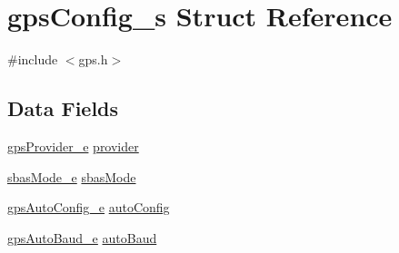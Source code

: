 \hypertarget{structgpsConfig__s}{\section{gps\+Config\+\_\+s Struct Reference}
\label{structgpsConfig__s}
}


{\ttfamily \#include $<$gps.\+h$>$}

\subsection*{Data Fields}
\begin{DoxyCompactItemize}
\item 
\hyperlink{config_2gps_8h_a50a4620e2a1bbefa83f1c86d3355fde7}{gps\+Provider\+\_\+e} \hyperlink{structgpsConfig__s_a86e16379d860f38c55616b6e8452e208}{provider}
\item 
\hyperlink{config_2gps_8h_a517917c9a4389dc3fbafd50e9b3f913a}{sbas\+Mode\+\_\+e} \hyperlink{structgpsConfig__s_a9ff23737ff073d47c104ac00960a88f5}{sbas\+Mode}
\item 
\hyperlink{config_2gps_8h_ab7d412bd5ef91fa644df9b945a62eb6f}{gps\+Auto\+Config\+\_\+e} \hyperlink{structgpsConfig__s_ad7d6e9caaa525b876126e7b9a4d7e47e}{auto\+Config}
\item 
\hyperlink{config_2gps_8h_a04fd48aa0abe345c8bdf90f9b97a2231}{gps\+Auto\+Baud\+\_\+e} \hyperlink{structgpsConfig__s_affa39b9cc980855149e1fe335a7d0ee8}{auto\+Baud}
\end{DoxyCompactItemize}


